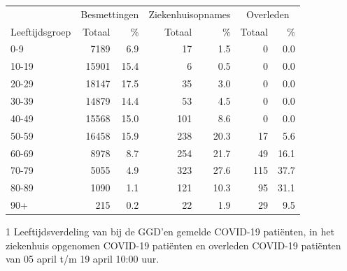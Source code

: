 \documentclass[
  english,
  man,floatsintext]{apa6}
\begin{document}
\begin{table}
\centering\begingroup\fontsize{11}{13}\selectfont

\begin{threeparttable}
\begin{tabular}{lrrrrrr}
\toprule
\multicolumn{1}{c}{ } & \multicolumn{2}{c}{Besmettingen} & \multicolumn{2}{c}{Ziekenhuisopnames} & \multicolumn{2}{c}{Overleden} \\
\cmidrule(l{3pt}r{3pt}){2-3} \cmidrule(l{3pt}r{3pt}){4-5} \cmidrule(l{3pt}r{3pt}){6-7}
Leeftijdsgroep & Totaal & \% & Totaal & \% & Totaal & \%\\
\midrule
0-9 & 7189 & 6.9 & 17 & 1.5 & 0 & 0.0\\
10-19 & 15901 & 15.4 & 6 & 0.5 & 0 & 0.0\\
20-29 & 18147 & 17.5 & 35 & 3.0 & 0 & 0.0\\
30-39 & 14879 & 14.4 & 53 & 4.5 & 0 & 0.0\\
40-49 & 15568 & 15.0 & 101 & 8.6 & 0 & 0.0\\
50-59 & 16458 & 15.9 & 238 & 20.3 & 17 & 5.6\\
60-69 & 8978 & 8.7 & 254 & 21.7 & 49 & 16.1\\
70-79 & 5055 & 4.9 & 323 & 27.6 & 115 & 37.7\\
80-89 & 1090 & 1.1 & 121 & 10.3 & 95 & 31.1\\
90+ & 215 & 0.2 & 22 & 1.9 & 29 & 9.5\\
\bottomrule
\end{tabular}
\begin{tablenotes}
\item[1] Leeftijdsverdeling van bij de GGD’en gemelde COVID-19 patiënten, in het ziekenhuis opgenomen COVID-19 patiënten en overleden COVID-19 patiënten van 05 april t/m 19 april 10:00 uur.
\end{tablenotes}
\end{threeparttable}
\endgroup{}
\end{table}

\newpage
\end{document}
